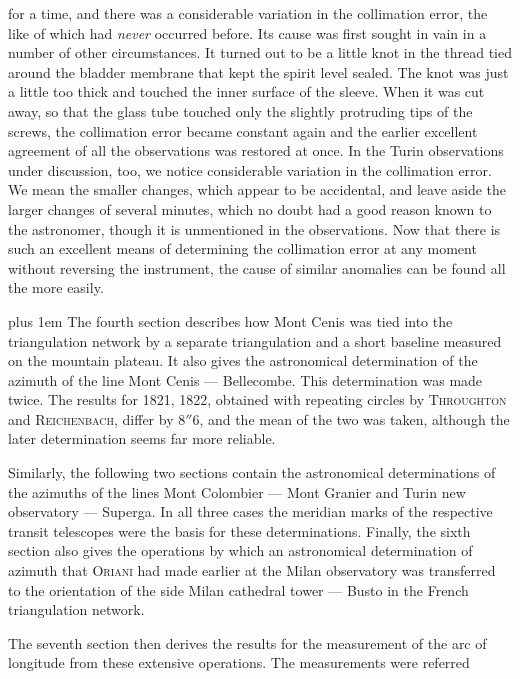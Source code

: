 %
for a time, and there was a considerable variation in the collimation error, the like of which had \textit{never} occurred before. Its cause was first sought in vain in a number of other circumstances. It turned out to be a little knot in the thread tied around the bladder membrane that kept the spirit level sealed. The knot was just a little too thick and touched the inner surface of the sleeve. When it was cut away, so that the glass tube touched only the slightly protruding tips of the screws, the collimation error became constant again and the earlier excellent agreement of all the observations was restored at once. In the Turin observations under discussion, too, we notice considerable variation in the collimation error. We mean the smaller changes, which appear to be accidental, and leave aside the larger changes of several minutes, which no doubt had a good reason known to the astronomer, though it is unmentioned in the observations. Now that there is such an excellent means of determining the collimation error at any moment without reversing the instrument, the cause of similar anomalies can be found all the more easily.

\begingroup\rightskip=0pt plus 1em
The fourth section describes how Mont Cenis was tied into the triangulation network by a separate triangulation and a short baseline measured on the mountain plateau. It also gives the astronomical determination of the azimuth of the line Mont Cenis --- Bellecombe. This determination was made twice. The results for 1821, 1822, obtained with repeating circles by \textsc{Throughton} and \textsc{Reichenbach}, differ by \(8''6\), and the mean of the two was taken, although the later determination seems far more reliable.\par
\endgroup

Similarly, the following two sections contain the astronomical determinations of the azimuths of the lines Mont Colombier --- Mont Granier and Turin new observatory --- Superga. In all three cases the meridian marks of the respective transit telescopes were the basis for these determinations. Finally, the sixth section also gives the operations by which an astronomical determination of azimuth that \textsc{Oriani} had made earlier at the Milan observatory was transferred to the orientation of the side Milan cathedral tower --- Busto in the French triangulation network.

The seventh section then derives the results for the measurement of the arc of longitude from these extensive operations. The measurements were referred
